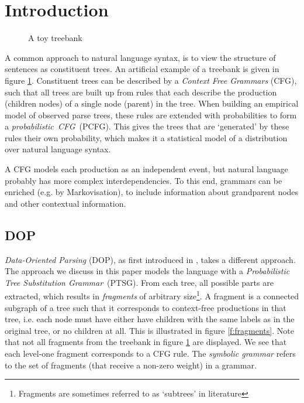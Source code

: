 
\section{Introduction}




\begin{figure}[h!]
\center 
\caption{A toy treebank} \label{f:treebank}
\end{figure}

A common approach to natural language syntax, is to view the structure of sentences as constituent trees. An artificial example of a treebank is given in figure \ref{f:treebank}. Constituent trees can be described by a \emph{Context Free Grammars} (CFG),  such that all trees are built up from  rules that each describe the production (children nodes) of a single node (parent) in the tree. When building an empirical model of observed parse trees, these rules are extended with probabilities to form a \emph{probabilistic~CFG}~(PCFG). This gives the trees that are `generated' by these rules their own probability, which makes it a statistical model of a distribution over natural language syntax.

A CFG models each production as an independent event, but natural language probably has more complex interdependencies. To this end, grammars can be enriched (e.g. by Markovisation), to include information about grandparent nodes and other contextual information. %

\subsection{DOP}
\emph{Data-Oriented Parsing} (DOP), as first introduced in \cite{scha1990}, takes a different approach. The approach we discuss in this paper models the language with a \emph{Probabilistic Tree Substitution Grammar}~(PTSG). %
From each tree, all possible parts are extracted, which results in \emph{fragments} of arbitrary size\footnote{Fragments are sometimes referred to as `subtrees' in literature}. %
A fragment is a connected subgraph of a tree such that it corresponds to context-free productions in that tree, i.e. each node must have either have children with the same labels as in the original tree, or no children at all. This is illustrated in figure \ref{f:fragments}. Note that not all fragments from the treebank in figure \ref{f:treebank} are displayed. We see that each level-one fragment corresponds to a CFG rule. The \emph{symbolic grammar} refers to the set of fragments (that receive a non-zero weight) in a grammar. 



